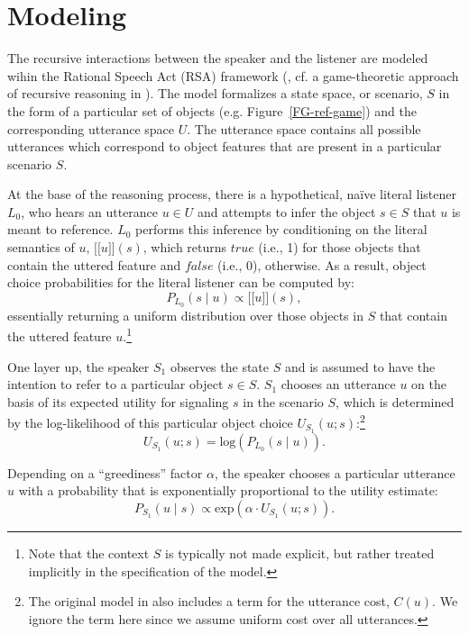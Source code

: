 \documentclass[10pt,a4paper]{article}
\newcommand{\sem}[1]{\mbox{$[\![$#1$]\!]$}}
\begin{document}
\section{Modeling}

The recursive interactions between the speaker and the listener are modeled wihin the Rational Speech Act (RSA)  framework (, cf. a game-theoretic approach of recursive reasoning in ). The model formalizes a state space, or scenario, $S$ in the form of a particular set of objects (e.g. Figure~\ref{FG-ref-game}) and the corresponding utterance space $U$. The utterance space contains all possible utterances which correspond to object features that are present in a particular scenario $S$.

At the base of the reasoning process, there is a hypothetical, na\"ive literal listener $L_0$, who hears an utterance $u\in U$ and attempts to infer the object $s \in S$ that $u$ is meant to reference. 
$L_0$ performs this inference by conditioning on the literal semantics of $u$, \sem{$u$}$(s)$, which returns $true$ (i.e., 1) for those objects that contain the uttered feature and $false$ (i.e., 0), otherwise.
As a result, object choice probabilities for the literal listener can be computed by: 
\begin{equation}
P_{L_{0}}(s\mid u) \propto \sem{$u$}(s),
\end{equation}
essentially returning a uniform distribution over those objects in $S$ that contain the uttered feature $u$.\footnote{Note that the context $S$ is typically not made explicit, but rather treated implicitly in the specification of the model.}


One layer up, the speaker $S_1$ observes the state $S$ and is assumed to have the intention to refer to a particular object $s \in S$.
$S_1$ chooses an utterance $u$ on the basis of its expected utility for signaling $s$ in the scenario $S$, which is determined by the log-likelihood of this particular object choice $U_{S_1}(u;s)$:\footnote{The original model in  also includes a term for the utterance cost, $C(u)$. We ignore the term here since we assume uniform cost over all utterances.}
\begin{equation}
U_{S_{1}}(u;s) = \textrm{log}(P_{L_{0}}(s \mid u)).
\end{equation}

Depending on a ``greediness'' factor $\alpha$, the speaker chooses a particular utterance $u$ with a probability that is exponentially proportional to the utility estimate: 
\begin{equation}
P_{S_{1}} (u \mid s) \propto   \textrm{exp}(\alpha \cdot U_{S_{1}} (u;s)).
\end{equation}
\end{document}
